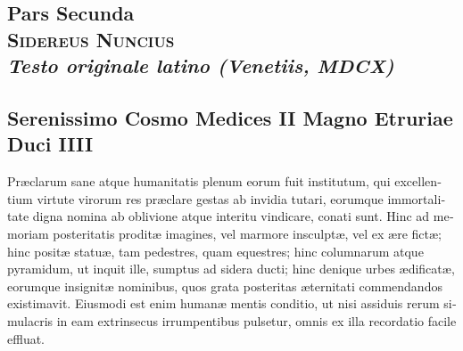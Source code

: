 \documentclass[11pt,twoside,openany]{book}
\begin{document}
\begin{otherlanguage}{latin}
\part*{Pars Secunda\\{\Large\scshape\color{rubric} Sidereus Nuncius}\\{\normalsize\itshape Testo originale latino (Venetiis, MDCX)}}

\chapter*{Serenissimo Cosmo Medices II Magno Etruriae Duci IIII}

Præclarum sane atque humanitatis plenum eorum fuit institutum, qui excellentium virtute virorum res præclare gestas ab invidia tutari, eorumque immortalitate digna nomina ab oblivione atque interitu vindicare, conati sunt. Hinc ad memoriam posteritatis proditæ imagines, vel marmore insculptæ, vel ex ære fictæ; hinc positæ statuæ, tam pedestres, quam equestres; hinc columnarum atque pyramidum, ut inquit ille,\textsc{ }sumptus ad sidera ducti; hinc denique urbes ædificatæ, eorumque insignitæ nominibus, quos grata posteritas æternitati commendandos existimavit. Eiusmodi est enim humanæ mentis conditio, ut nisi assiduis rerum simulacris in eam extrinsecus irrumpentibus pulsetur, omnis ex illa recordatio facile effluat.


\end{otherlanguage}
\end{document}
